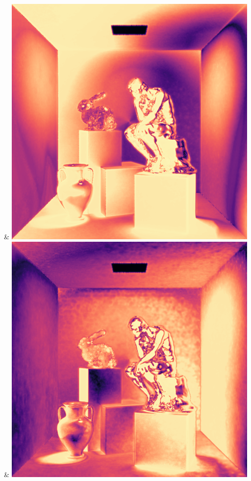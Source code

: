& \includegraphics[width=\linewidth]{figures/py/tests/batch_size/5+nrc+pt+16_1spp_flip.png}
& \includegraphics[width=\linewidth]{figures/py/tests/batch_size/25+nrc+pt+16_1spp_flip.png}
